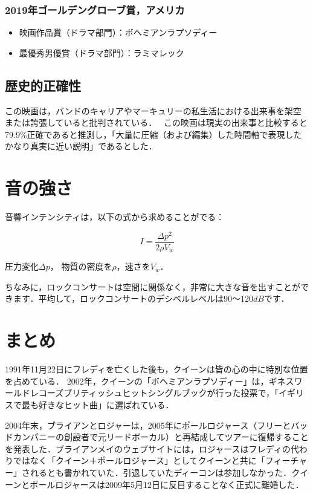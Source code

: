 \documentclass[a4j, twocolumn]{jarticle}
\begin{document}
\subsubsection{2019年ゴールデングローブ賞，アメリカ}
\begin{itemize}
  \item 映画作品賞（ドラマ部門）：ボヘミアンラプソディー
  \item 最優秀男優賞（ドラマ部門）：ラミマレック
\end{itemize}
\vspace{-20pt}
\subsection{歴史的正確性}
この映画は，バンドのキャリアやマーキュリーの私生活における出来事を架空または誇張していると批判されている．\cite{Baillie}~ この映画は現実の出来事と比較すると79.9\%正確であると推測し，「大量に圧縮（および編集）した時間軸で表現したかなり真実に近い説明」であるとした．\cite{Site}

\section{音の強さ}

音響インテンシティは，以下の式から求めることがでる：

\begin{equation}
  \label{eq1}
  I = 
  \frac{
    \Delta p^2
  }{
    2\rho V_w
  }
\end{equation}

\vspace{15pt}
圧力変化$\Delta p$， 物質の密度を$\rho$，速さを$V_w$．

ちなみに，ロックコンサートは空間に関係なく，非常に大きな音を出すことができます．平均して，ロックコンサートのデシベルレベルは$90 ～ 120 dB$です．

\section{まとめ}

1991年11月22日にフレディを亡くした後も，クイーンは皆の心の中に特別な位置を占めている．
2002年，クイーンの「ボヘミアンラプソディー」は，ギネスワールドレコーズブリティッシュヒットシングルブックが行った投票で，「イギリスで最も好きなヒット曲」に選ばれている．

2004年末，ブライアンとロジャーは，2005年にポールロジャース（フリーとバッドカンパニーの創設者で元リードボーカル）と再結成してツアーに復帰することを発表した．ブライアンメイのウェブサイトには，ロジャースはフレディの代わりではなく「クイーン＋ポールロジャース」としてクイーンと共に「フィーチャー」されるとも書かれていた．引退していたディーコンは参加しなかった．クイーンとポールロジャースは2009年5月12日に反目することなく正式に離婚した．
\end{document}
